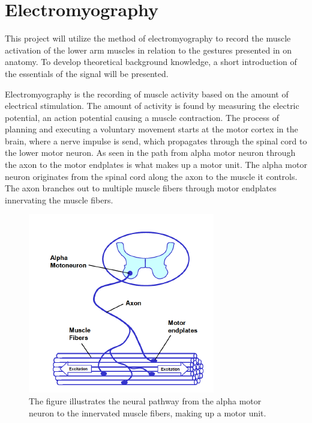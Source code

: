 

\section{Electromyography} \label{sec:EMG}

This project will utilize the method of electromyography to record the muscle activation of the lower arm muscles in relation to the gestures presented in  on anatomy. To develop theoretical background knowledge, a short introduction of the essentials of the signal will be presented. 

Electromyography is the recording of muscle activity based on the amount of electrical stimulation. The amount of activity is found by measuring the electric potential, an action potential causing a muscle contraction. The process of planning and executing a voluntary movement starts at the motor cortex in the brain, where a nerve impulse is send, which propagates through the spinal cord to the lower motor neuron. As seen in  the path from alpha motor neuron through the axon to the motor endplates is what makes up a motor unit. The alpha motor neuron originates from the spinal cord along the axon to the muscle it controls. The axon branches out to multiple muscle fibers through motor endplates innervating the muscle fibers.

\begin{figure}[H]                                         
	\includegraphics[width=.4\textwidth]{figures/motor_unit}  
	\caption{The figure illustrates the neural pathway from the alpha motor neuron to the innervated muscle fibers, making up a motor unit.\cite{Konrad2005}}
	\label{fig:motor} 
\end{figure}  

